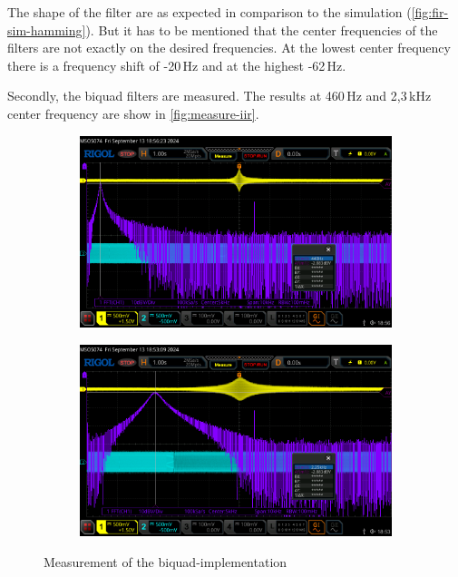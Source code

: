 The shape of the filter are as expected in comparison to the simulation (\autoref{fig:fir-sim-hamming}).
But it has to be mentioned that the center frequencies of the filters are not exactly on the desired
frequencies. At the lowest center frequency there is a frequency shift of -20\,Hz and at the highest
-62\,Hz.

Secondly, the biquad filters are measured. The results at 460\,Hz and 2,3\,kHz center frequency are show in
\autoref{fig:measure-iir}.

\begin{figure}[!h]
    \centering
    \begin{subfigure}[c]{0.49\textwidth}
        \centering
        \includegraphics[width=\textwidth]{img/iir_measure_460.png}
    \end{subfigure}
    \begin{subfigure}[c]{0.49\textwidth}
        \centering
        \includegraphics[width=\textwidth]{img/iir_measure_2300.png}
    \end{subfigure}
    \caption{Measurement of the biquad-implementation}
    \label{fig:measure-iir}
\end{figure}

